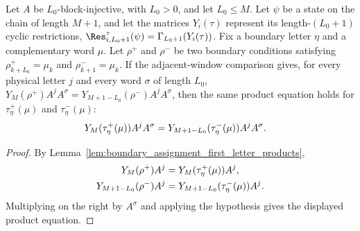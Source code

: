 \begin{lemma}
    \label{lem:boundary_closing_product_compatible_backgrounds}
    \leanok
    Let $A$ be $L_0$-block-injective, with $L_0>0$, and let $L_0\le M$.
    Let $\psi$ be a state on the chain of length $M+1$, and let the matrices
    $Y_i(\tau)$ represent its length-$(L_0+1)$ cyclic restrictions,
    $\Res^\tau_{i,L_0+1}(\psi)=\Gamma_{L_0+1}(Y_i(\tau))$. Fix a boundary
    letter $\eta$ and a complementary word $\mu$. Let $\rho^+$ and $\rho^-$ be
    two boundary conditions satisfying
    $\rho^+_{k+L_0}=\mu_k$ and $\rho^-_{k+1}=\mu_k$. If the adjacent-window
    comparison gives, for every physical letter $j$ and every word $\sigma$ of
    length $L_0$,
    $Y_M(\rho^+)A^jA^\sigma =Y_{M+1-L_0}(\rho^-)A^jA^\sigma$,
    then the same product equation holds for $\tau^+_\eta(\mu)$ and
    $\tau^-_\eta(\mu)$:
    \begin{align}
        Y_M(\tau^+_\eta(\mu))A^jA^\sigma
         & =Y_{M+1-L_0}(\tau^-_\eta(\mu))A^jA^\sigma. \notag
    \end{align}
\end{lemma}

\begin{proof}
    \leanok
    By Lemma~\ref{lem:boundary_assignment_first_letter_products},
    \begin{align}
        Y_M(\rho^+)A^j
         & =Y_M(\tau^+_\eta(\mu))A^j, \notag         \\
        Y_{M+1-L_0}(\rho^-)A^j
         & =Y_{M+1-L_0}(\tau^-_\eta(\mu))A^j. \notag
    \end{align}
    Multiplying on the right by $A^\sigma$ and applying the hypothesis gives
    the displayed product equation.
\end{proof}

